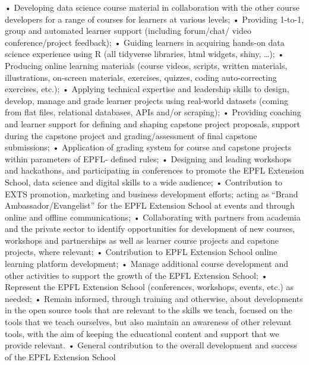 \documentclass[
]{article}
\begin{document}
• Developing data science course material in collaboration with the
other course developers for a range of courses for learners at various
levels; • Providing 1-to-1, group and automated learner support
(including forum/chat/ video conference/project feedback); • Guiding
learners in acquiring hands-on data science experience using R (all
tidyverse libraries, html widgets, shiny, \ldots); • Producing online
learning materials (course videos, scripts, written materials,
illustrations, on-screen materials, exercises, quizzes, coding
auto-correcting exercises, etc.); • Applying technical expertise and
leadership skills to design, develop, manage and grade learner projects
using real-world datasets (coming from flat files, relational databases,
APIs and/or scraping); • Providing coaching and learner support for
defining and shaping capstone project proposals, support during the
capstone project and grading/assessment of final capstone submissions; •
Application of grading system for course and capstone projects within
parameters of EPFL- defined rules; • Designing and leading workshops and
hackathons, and participating in conferences to promote the EPFL
Extension School, data science and digital skills to a wide audience; •
Contribution to EXTS promotion, marketing and business development
efforts; acting as ``Brand Ambassador/Evangelist'' for the EPFL
Extension School at events and through online and offline
communications; • Collaborating with partners from academia and the
private sector to identify opportunities for development of new courses,
workshops and partnerships as well as learner course projects and
capstone projects, where relevant; • Contribution to EPFL Extension
School online learning platform development; • Manage additional course
development and other activities to support the growth of the EPFL
Extension School; • Represent the EPFL Extension School (conferences,
workshops, events, etc.) as needed; • Remain informed, through training
and otherwise, about developments in the open source tools that are
relevant to the skills we teach, focused on the tools that we teach
ourselves, but also maintain an awareness of other relevant tools, with
the aim of keeping the educational content and support that we provide
relevant. • General contribution to the overall development and success
of the EPFL Extension School
\end{document}
